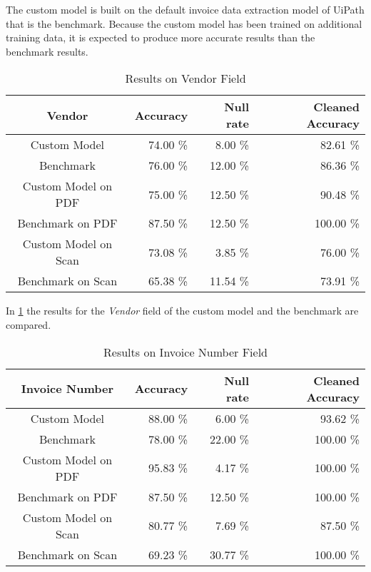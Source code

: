 The custom model is built on the default invoice data extraction model of UiPath that is the benchmark. Because the custom model has been trained on additional training data, it is expected to produce more accurate results than the benchmark results.

\begin{table}[ht]   %
    \centering
    \footnotesize
    \begin{tabular}{c|rrr} %
        \toprule    %
        Vendor  & Accuracy  & Null rate & Cleaned Accuracy \\
        \midrule    %
        Custom Model               & 74.00 \%   & 8.00 \%   & 82.61 \% \\
        Benchmark           & 76.00 \%   & 12.00 \%  & 86.36 \%\\
        \midrule    %
        Custom Model on PDF        & 75.00 \%   & 12.50 \%  & 90.48 \% \\
        Benchmark on PDF    & 87.50 \%   & 12.50 \%  & 100.00 \% \\
        \midrule    %
        Custom Model on Scan       & 73.08 \%  & 3.85 \%   & 76.00 \% \\
        Benchmark on Scan   & 65.38 \%  & 11.54 \%  & 73.91 \% \\

        \bottomrule %
    \end{tabular}
    \caption{Results on Vendor Field}
    \label{table:Model_Bench_Vendor}
\end{table}
In \cref{table:Model_Bench_Vendor} the results for the \textit{Vendor} field of the custom model and the benchmark are compared. 
\begin{table}[ht]   %
    \centering
    \footnotesize
    \begin{tabular}{c|rrr} %
        \toprule    %
        Invoice Number  & Accuracy  & Null rate & Cleaned Accuracy \\
        \midrule    %
        Custom Model               & 88.00 \%   & 6.00 \%   & 93.62 \% \\
        Benchmark           & 78.00 \%   & 22.00 \%  & 100.00 \%\\
        \midrule    %
        Custom Model on PDF        & 95.83 \%   & 4.17 \%  & 100.00 \% \\
        Benchmark on PDF    & 87.50 \%   & 12.50 \%  & 100.00 \% \\
        \midrule    %
        Custom Model on Scan       & 80.77 \%  & 7.69 \%   & 87.50 \% \\
        Benchmark on Scan   & 69.23 \%  & 30.77 \%  & 100.00 \% \\

        \bottomrule %
    \end{tabular}
    \caption{Results on Invoice Number Field}
    \label{table:Model_Bench_Number}
\end{table}

